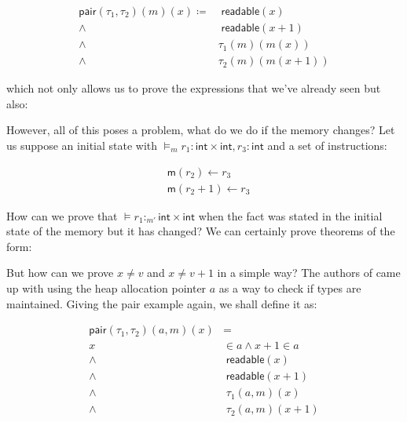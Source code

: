 \documentclass{article}
\begin{document}
\begin{align*}
  \mathsf{pair}(\tau_1,\tau_2)(m)(x) \coloneqq
  &\;\mathsf{readable}(x)\\ 
  \wedge&\;\mathsf{readable}(x+1)\\
  \wedge&\tau_1(m)(m(x))\\ 
  \wedge&\tau_2(m)(m(x+1))
\end{align*}

which not only allows us to prove the expressions
that we've already seen but also:

\begin{prooftree}
\end{prooftree}

However, all of this poses a problem, what do we 
do if the memory changes? Let us suppose an initial 
state with 
$\models_m r_1: \mathsf{int}\times\mathsf{int}, r_3: 
\mathsf{int}$ and a set of instructions:

\begin{align*}
  &\mathsf{m}(r_2)\leftarrow r_3\\
  &\mathsf{m}(r_2+1)\leftarrow r_3
\end{align*}

How can we prove that 
$\models r_1:_{m'} \mathsf{int}\times\mathsf{int}$ when 
the fact was stated in the initial state of the 
memory but it has changed? We can certainly prove 
theorems of the form:

\begin{prooftree}
\end{prooftree}

But how can we prove $x\neq v$ and $x\neq v+1$ in a
simple way? The authors of \cite{appel:fpcc:semantic} 
came up with using the heap allocation pointer $a$ as 
a way to check if types are maintained. Giving the 
pair example again, we shall define it as:

\begin{align*}
  \mathsf{pair}(\tau_1,\tau_2)(a,m)(x)&=\\
  x&\in a\wedge x+1\in a\\
  \wedge&\;\mathsf{readable}(x) \\
  \wedge&\;\mathsf{readable}(x+1)\\
  \wedge&\;\tau_1(a, m)(x)\\
  \wedge&\;\tau_2(a, m)(x+1)
\end{align*}
\end{document}
